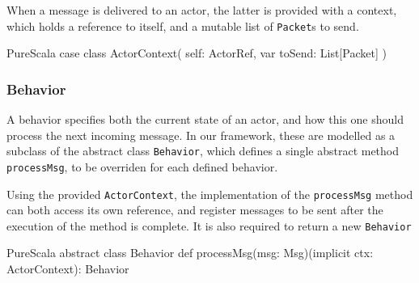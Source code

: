 \documentclass[a4paper,twoside]{article}
\newcommand{\InlineS}[1]{\lstinline[language=PureScala,basicstyle=\small\ttfamily,columns=fixed]|#1|}
\begin{document}
When a message is delivered to an actor, the latter is provided with a context,
which holds a reference to itself, and a mutable list of \InlineS{Packet}s to send.

\begin{ShortCode}{PureScala}
case class ActorContext(
  self: ActorRef,
  var toSend: List[Packet]
)
\end{ShortCode}

\vspace{-15pt}
\subsubsection*{Behavior}

A behavior specifies both the current state of an actor, and how this one should 
process the next incoming message. In our framework, these are modelled as a subclass 
of the abstract class \InlineS{Behavior}, which defines a single abstract method 
\InlineS{processMsg}, to be overriden for each defined behavior.

Using the provided \InlineS{ActorContext}, the implementation of the \InlineS{processMsg}
method can both access its own reference, and register messages to be sent after the
execution of the method is complete. It is also required to return a new \InlineS{Behavior}

\begin{ShortCode}{PureScala}
abstract class Behavior {
  def processMsg(msg: Msg)(implicit ctx: ActorContext): Behavior
}
\end{ShortCode}

%
%

\vspace{-15pt}
\end{document}
